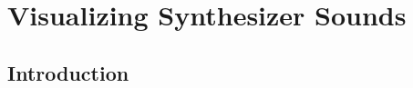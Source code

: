 \graphicspath{{./}{./figures/}{./figures/synthexplore/}}




\chapter{Visualizing Synthesizer Sounds}
\label{ch:visualization}

\section{Introduction}


